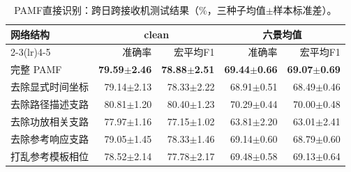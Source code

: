 \documentclass[10pt,journal]{IEEEtran}
\begin{document}
\begin{table}[!t]

\caption{PAMF直接识别：跨日跨接收机测试结果（\%，三种子均值\ensuremath{\pm}样本标准差）。}

\label{tab:absolute}

\centering\small

\begin{tabular*}{\textwidth}{@{\extracolsep{\fill}}lrrrr@{}}

\toprule

网络结构 & \multicolumn{2}{c}{clean} & \multicolumn{2}{c}{六景均值} \\

\cmidrule(lr){2-3}\cmidrule(lr){4-5}

 & 准确率 & 宏平均F1 & 准确率 & 宏平均F1 \\

\midrule

完整 PAMF & \textbf{79.59\ensuremath{\pm}2.46} & \textbf{78.88\ensuremath{\pm}2.51} & \textbf{69.44\ensuremath{\pm}0.66} & \textbf{69.07\ensuremath{\pm}0.69} \\

去除显式时间坐标 & 79.14\ensuremath{\pm}2.13 & 78.33\ensuremath{\pm}2.22 & 68.91\ensuremath{\pm}0.51 & 68.49\ensuremath{\pm}0.46 \\

去除路径描述支路 & 80.81\ensuremath{\pm}1.20 & 80.40\ensuremath{\pm}1.23 & 70.29\ensuremath{\pm}0.44 & 70.00\ensuremath{\pm}0.48 \\

去除功放相关支路 & 77.97\ensuremath{\pm}1.16 & 77.15\ensuremath{\pm}1.02 & 63.81\ensuremath{\pm}2.20 & 63.01\ensuremath{\pm}2.41 \\

去除参考响应支路 & 79.05\ensuremath{\pm}1.45 & 78.33\ensuremath{\pm}1.46 & 69.14\ensuremath{\pm}0.60 & 68.79\ensuremath{\pm}0.60 \\

打乱参考模板相位 & 78.52\ensuremath{\pm}2.14 & 77.78\ensuremath{\pm}2.17 & 69.48\ensuremath{\pm}0.58 & 69.13\ensuremath{\pm}0.64 \\

\bottomrule

\end{tabular*}

\end{table}
\end{document}
